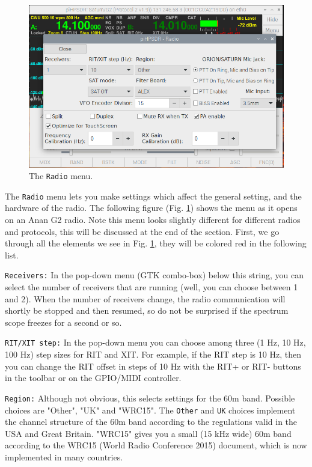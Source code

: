 \documentclass[12pt]{book}
\def\rett#1{\texttt{\color{red}#1}}
\def\bltt#1{\texttt{\color{blue}#1}}
\begin{document}
\begin{figure}[ht]
\center
\includegraphics[width=12cm]{RadioMenu.png}
\caption{The \bltt{Radio} menu.}
\label{fig:RadioMenu}
\end{figure}


The \bltt{Radio} menu lets you make settings which affect the general setting, and the hardware of the 
radio.
The following figure (Fig. \ref{fig:RadioMenu}) shows the menu as it opens on an Anan G2 radio.
Note this menu looks slightly different for different radios and protocols, this will be discussed
at the end of the section. First, we go through all the elements we see in Fig. \ref{fig:RadioMenu},
they will be colored red in the following list.

\rett{Receivers:} In the pop-down menu (GTK combo-box) below this string, you can select the number
of receivers that are running (well, you can choose between 1 and 2). When the number of receivers change,
the radio communication will shortly be stopped and then resumed, so do not be surprised if the spectrum
scope freezes for a second or so.

\rett{RIT/XIT step:} In the pop-down menu you can choose among three (1 Hz, 10 Hz, 100 Hz) step sizes
for RIT and XIT. For example, if the RIT step is 10 Hz, then you can change the RIT offset in steps of
10 Hz with the RIT+ or RIT- buttons in the toolbar or on the GPIO/MIDI controller.

\rett{Region:} Although not obvious, this selects settings for the 60m band. Possible choices are "Other",
 "UK" and "WRC15". The \texttt{Other} and \texttt{UK} choices implement the channel structure of the 60m 
 band according to the regulations valid in the USA and Great Britain. "WRC15" gives you a small (15 kHz 
 wide) 60m band according to the WRC15 (World Radio Conference 2015) document, which is now implemented in 
 many countries. 
\end{document}
